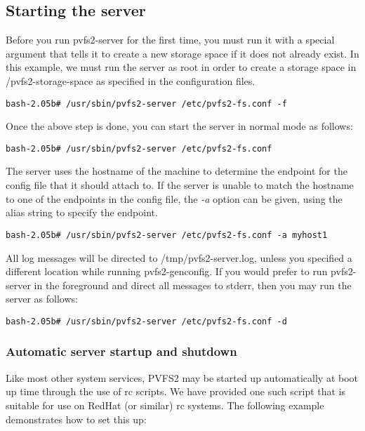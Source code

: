 \documentclass[11pt, letterpaper]{article}
\begin{document}
\subsection{Starting the server}

Before you run pvfs2-server for the first time, you must run it with a special 
argument that tells it to create a new storage space if it does not already 
exist.  In this example, we must run the server as root in order to create
a storage space in /pvfs2-storage-space as specified in the configuration
files.

\begin{verbatim}
bash-2.05b# /usr/sbin/pvfs2-server /etc/pvfs2-fs.conf -f
\end{verbatim}

Once the above step is done, you can start the server in normal mode 
as follows:

\begin{verbatim}
bash-2.05b# /usr/sbin/pvfs2-server /etc/pvfs2-fs.conf 
\end{verbatim}

The server uses the hostname of the machine to determine the endpoint
for the config file that it should attach to.  If the server is unable
to match the hostname to one of the endpoints in the config file, the
\emph{-a} option can be given, using the alias string
to specify the endpoint.

\begin{verbatim}
bash-2.05b# /usr/sbin/pvfs2-server /etc/pvfs2-fs.conf -a myhost1
\end{verbatim}

All log messages will be directed to /tmp/pvfs2-server.log, unless you specified
a different location while running pvfs2-genconfig.  If you would prefer to run 
pvfs2-server in the foreground and direct all messages to stderr, then 
you may run the server as follows:

\begin{verbatim}
bash-2.05b# /usr/sbin/pvfs2-server /etc/pvfs2-fs.conf -d
\end{verbatim}

\subsubsection{Automatic server startup and shutdown}
\label{sec:rc}

Like most other system services, PVFS2 may be started up automatically
at boot up time through the use of rc scripts.  We have provided one
such script that is suitable for use on RedHat (or similar) rc
systems.  The following example demonstrates how to set this up:
\end{document}
